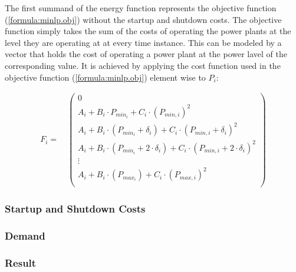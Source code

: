 The first summand of the energy function represents the objective function (\ref{formula:minlp.obj}) without the startup and shutdown costs.
The objective function simply takes the sum of the costs of operating the power plants at the level they are operating at at every time instance.
This can be modeled by a vector that holds the cost of operating a power plant at the power lavel of the corresponding value.
It is achieved by applying the cost function used in the objective function (\ref{formula:minlp.obj}) element wise to $P_i$:

\begin{align}
  F_i = \quad \begin{pmatrix}
    0 \\
    A_i + B_i \cdot P_{min_i} + C_i \cdot \left( P_{min, i} \right)^2 \\
    A_i + B_i \cdot \left( P_{min_i} + \delta_i \right) + C_i \cdot \left( P_{min, i} + \delta_i \right)^2 \\
    A_i + B_i \cdot \left( P_{min_i} + 2 \cdot \delta_i \right) + C_i \cdot \left( P_{min, i} + 2 \cdot \delta_i \right)^2 \\
    \vdots \\
    A_i + B_i \cdot \left( P_{max_i} \right) + C_i \cdot \left( P_{max, i} \right)^2 \\
  \end{pmatrix}
\end{align}

\subsubsection{Startup and Shutdown Costs}


\subsubsection{Demand}


\subsubsection{Result}

